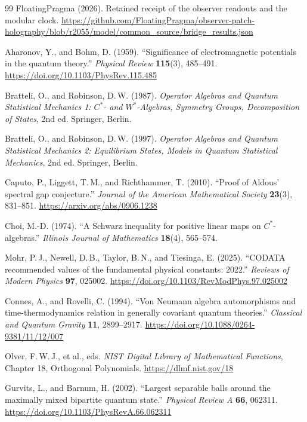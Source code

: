 \documentclass[11pt]{article}
\theoremstyle{definition}
\theoremstyle{remark}
\theoremstyle{plain}
\begin{document}
{\begin{thebibliography}{99}
FloatingPragma (2026). Retained receipt of the observer readouts and the
modular clock.
\url{https://github.com/FloatingPragma/observer-patch-holography/blob/r2055/model/common_source/bridge_results.json}

Aharonov, Y., and Bohm, D. (1959). ``Significance of electromagnetic potentials
in the quantum theory.'' \emph{Physical Review} \textbf{115}(3), 485--491.
\url{https://doi.org/10.1103/PhysRev.115.485}

Bratteli, O., and Robinson, D.\,W. (1987). \emph{Operator Algebras and Quantum
Statistical Mechanics 1: $C^*$- and $W^*$-Algebras, Symmetry Groups,
Decomposition of States}, 2nd ed. Springer, Berlin.

Bratteli, O., and Robinson, D.\,W. (1997). \emph{Operator Algebras and Quantum
Statistical Mechanics 2: Equilibrium States, Models in Quantum Statistical
Mechanics}, 2nd ed. Springer, Berlin.

Caputo, P., Liggett, T.\,M., and Richthammer, T. (2010). ``Proof of Aldous'
spectral gap conjecture.'' \emph{Journal of the American Mathematical Society}
\textbf{23}(3), 831--851. \url{https://arxiv.org/abs/0906.1238}

Choi, M.-D. (1974). ``A Schwarz inequality for positive linear maps on
$C^*$-algebras.'' \emph{Illinois Journal of Mathematics} \textbf{18}(4),
565--574.

Mohr, P.\,J., Newell, D.\,B., Taylor, B.\,N., and Tiesinga, E. (2025).
``CODATA recommended values of the fundamental physical constants: 2022.''
\emph{Reviews of Modern Physics} \textbf{97}, 025002.
\url{https://doi.org/10.1103/RevModPhys.97.025002}

Connes, A., and Rovelli, C. (1994). ``Von Neumann algebra automorphisms and
time-thermodynamics relation in generally covariant quantum theories.''
\emph{Classical and Quantum Gravity} \textbf{11}, 2899--2917.
\url{https://doi.org/10.1088/0264-9381/11/12/007}

Olver, F.\,W.\,J., et al., eds. \emph{NIST Digital Library of Mathematical
Functions}, Chapter 18, Orthogonal Polynomials. \url{https://dlmf.nist.gov/18}

Gurvits, L., and Barnum, H. (2002). ``Largest separable balls around the
maximally mixed bipartite quantum state.'' \emph{Physical Review A}
\textbf{66}, 062311. \url{https://doi.org/10.1103/PhysRevA.66.062311}


\end{thebibliography}}
\end{document}
